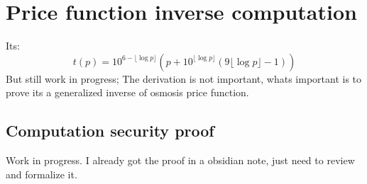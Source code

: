 \documentclass[11pt]{article}
\begin{document}
\section{Price function inverse computation}
Its:
\[
t(p) = 10^{6-\lfloor\log p\rfloor} \left(
	p+10^{\lfloor\log p\rfloor}\left(
		9\lfloor\log p\rfloor-1
	\right)
\right)
\]
But still work in progress; The derivation is not important, whats important
is to prove its a generalized inverse of osmosis price function.
\subsection{Computation security proof}
Work in progress. I already got the proof in a obsidian note, just need
to review and formalize it.

\break


\end{document}
